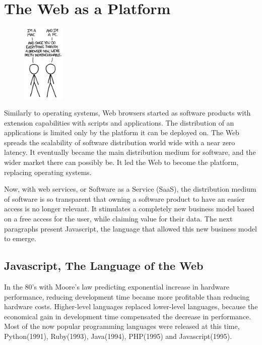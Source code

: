 \section{The Web as a Platform} \label{chapter2:web-as-a-platform}

\begin{figure}
  \vspace{-27pt}
  \begin{center}
    \includegraphics[width=0.18\textwidth]{../ressources/Mac-PC.png}
  \end{center}
  \vspace{-20pt}
\end{figure}

Similarly to operating systems, Web browsers started as software products with extension capabilities with scripts and applications.
The distribution of an applications is limited only by the platform it can be deployed on.
The Web spreads the scalability of software distribution world wide with a near zero latency.
It eventually became the main distribution medium for software, and the wider market there can possibly be.
It led the Web to become the platform, replacing operating systems.

Now, with web services, or Software as a Service (SaaS), the distribution medium of software is so transparent that owning a software product to have an easier access is no longer relevant.
It stimulates a completely new business model based on a free access for the user, while claiming value for their data.
The next paragraphs present Javascript, the language that allowed this new business model to emerge.

\subsection{Javascript, The Language of the Web}

In the 80's with Moore's law predicting exponential increase in hardware performance, reducing development time became more profitable than reducing hardware costs.
Higher-level languages replaced lower-level languages, because the economical gain in development time compensated the decrease in performance.
Most of the now popular programming languages were released at this time, Python(1991), Ruby(1993), Java(1994), PHP(1995) and Javascript(1995).

